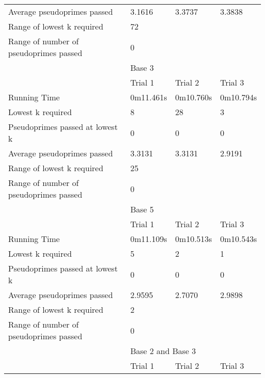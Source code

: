\documentclass{article}
\begin{document}
\begin{appendices}
\begin{longtable}{llll}
Average pseudoprimes passed            & 3.1616      & 3.3737     & 3.3838     \\\cmidrule(lr){2-4}
Range of lowest k required             & \multicolumn{3}{l}{72}                \\
Range of number of pseudoprimes passed & \multicolumn{3}{l}{0}                 \\\midrule
                                       & \multicolumn{3}{l}{Base 3}            \\\midrule
                                       & Trial 1     & Trial 2    & Trial 3    \\
Running Time                           & 0m11.461s   & 0m10.760s  & 0m10.794s  \\
Lowest k required                      & 8           & 28         & 3          \\
Pseudoprimes passed at lowest k        & 0           & 0          & 0          \\
Average pseudoprimes passed            & 3.3131      & 3.3131     & 2.9191     \\\cmidrule(lr){2-4}
Range of lowest k required             & \multicolumn{3}{l}{25}                \\
Range of number of pseudoprimes passed & \multicolumn{3}{l}{0}                 \\\midrule
                                       & \multicolumn{3}{l}{Base 5}            \\\midrule
                                       & Trial 1     & Trial 2    & Trial 3    \\
Running Time                           & 0m11.109s   & 0m10.513s  & 0m10.543s  \\
Lowest k required                      & 5           & 2          & 1          \\
Pseudoprimes passed at lowest k        & 0           & 0          & 0          \\
Average pseudoprimes passed            & 2.9595      & 2.7070     & 2.9898     \\\cmidrule(lr){2-4}
Range of lowest k required             & \multicolumn{3}{l}{2}                 \\
Range of number of pseudoprimes passed & \multicolumn{3}{l}{0}                 \\\midrule
                                       & \multicolumn{3}{l}{Base 2 and Base 3} \\\midrule
                                       & Trial 1     & Trial 2    & Trial 3    \\

\end{longtable}
\end{appendices}
\end{document}

